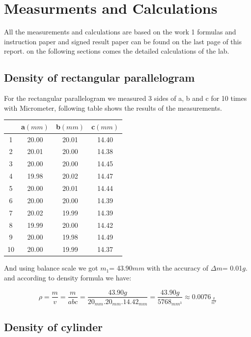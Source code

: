 \documentclass[a4paper, 12pt]{article}
\begin{document}
\section{Measurments and Calculations}

All the measurements and calculations are based on the work 1 formulas and instruction paper and signed result paper can be found on the last page of this report. on the following sections comes the detailed calculations of the lab.

\subsection{Density of rectangular parallelogram}

For the rectangular parallelogram we measured 3 sides of a, b and c for 10 times with Micrometer, following table shows the results of the measurements.

\begin{center}
	\begin{tabular}{||c c c c||} 
		\hline
		   &  a\((mm)\) & b\((mm)\)  &  c\((mm)\)  \\ [0.5ex] 
		\hline\hline
		1 & 20.00 & 20.01 & 14.40 \\ 
		\hline
		2 & 20.01 & 20.00 & 14.38 \\
		\hline
		3 & 20.00 & 20.00 & 14.45 \\
		\hline
		4 & 19.98 & 20.02 & 14.47 \\
		\hline
		5 & 20.00 & 20.01 & 14.44 \\
		\hline
		6 & 20.00 & 20.00 & 14.39 \\
		\hline
		7 & 20.02 & 19.99 & 14.39 \\
		\hline
		8 & 19.99 & 20.00 & 14.42 \\
		\hline
		9 & 20.00 & 19.98 & 14.49 \\
		\hline
		10 & 20.00 & 19.99 &  14.37 \\ [1ex] 
		\hline
	\end{tabular}
\end{center}

And using balance scale we got \(m_{1}\)= 43.90\(mm\) with the accuracy of \(\varDelta m\)= 0.01\(g\). and according to density formula we have:

\[
\rho = \dfrac{m}{v} = \dfrac{m}{abc} = \dfrac{43.90g}{20_{mm}.20_{mm}.14.42_{mm}} = \dfrac{43.90g}{5768_{mm^{3}}} \approx 0.0076_{\frac{g}{m^{3}}}
\]

\subsection{Density of cylinder}
\end{document}
